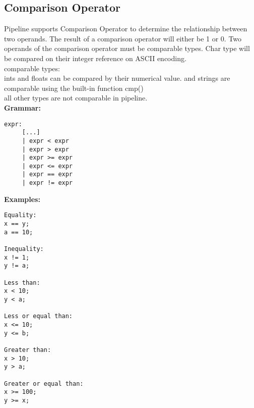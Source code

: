 \documentclass[./LRM_main.tex]{subfiles}
\begin{document}
\subsection{Comparison Operator}
Pipeline supports Comparison Operator to determine the relationship between two operands. The result of a comparison operator will either be 1 or 0. Two operands of the comparison operator must be comparable types. Char type will be compared on their integer reference on ASCII encoding.\\
comparable types:\\
ints and floats can be compared by their numerical value. and strings are comparable using the built-in function cmp()\\
all other types are not comparable in pipeline.\\
\vspace{1 mm}
\textbf{Grammar:}
\begin{lstlisting}
expr:
     [...]
     | expr < expr
     | expr > expr
     | expr >= expr
     | expr <= expr
     | expr == expr
     | expr != expr

\end{lstlisting}
\vspace{1 mm}
\textbf{Examples:}
\begin{lstlisting}
Equality:
x == y;
a == 10;

Inequality:
x != 1;
y != a;

Less than:
x < 10;
y < a;

Less or equal than:
x <= 10;
y <= b;

Greater than:
x > 10;
y > a;

Greater or equal than:
x >= 100;
y >= x;

\end{lstlisting}
\end{document}
